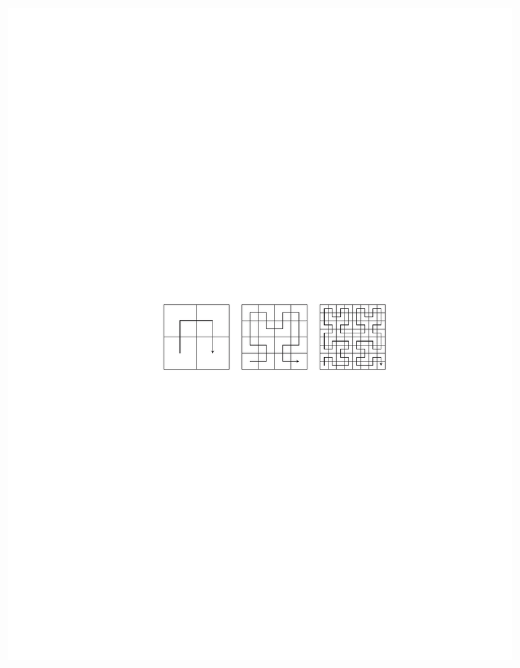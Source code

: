 \documentclass[mathserif, 8pt]{beamer}
\begin{document}
\begin{frame}
\begin{columns}
\begin{column}{0.6\textwidth}
	\includegraphics[scale=0.5, viewport = 150 350 500 435, clip]{figures/hilbert.pdf}
    \end{column}
    \end{columns}
\end{frame}
\end{document}
